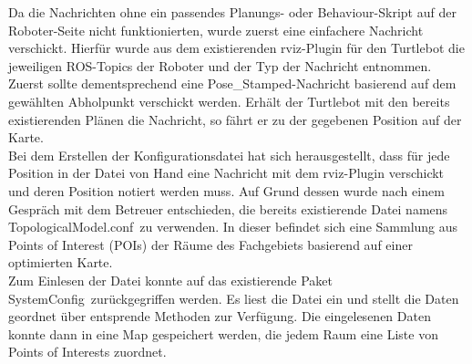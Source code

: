 \documentclass[a4paper,12pt,headsepline]{scrartcl}
\begin{document}
		Da die Nachrichten ohne ein passendes Planungs- oder Behaviour-Skript auf der Roboter-Seite nicht funktionierten, wurde zuerst eine einfachere Nachricht verschickt. Hierfür wurde aus dem existierenden rviz-Plugin für den Turtlebot die jeweiligen ROS-Topics der Roboter und der Typ der Nachricht entnommen. Zuerst sollte dementsprechend eine \glqq Pose{\_}Stamped\grqq-Nachricht basierend auf dem gewählten Abholpunkt verschickt werden. Erhält der Turtlebot mit den bereits existierenden Plänen die Nachricht, so fährt er zu der gegebenen Position auf der Karte.\\
		Bei dem Erstellen der Konfigurationsdatei hat sich herausgestellt, dass für jede Position in der Datei von Hand eine Nachricht mit dem rviz-Plugin verschickt und deren Position notiert werden muss. Auf Grund dessen wurde nach einem Gespräch mit dem Betreuer entschieden, die bereits existierende Datei namens \glqq TopologicalModel.conf\grqq\ zu verwenden. In dieser befindet sich eine Sammlung aus Points of Interest (POIs) der Räume des Fachgebiets basierend auf einer optimierten Karte.\\
Zum Einlesen der Datei konnte auf das existierende Paket \glqq SystemConfig\grqq\ zurückgegriffen werden. Es liest die Datei ein und stellt die Daten geordnet über entsprende Methoden zur Verfügung. Die eingelesenen Daten konnte dann in eine Map gespeichert werden, die jedem Raum eine Liste von Points of Interests zuordnet.\\
\end{document}

